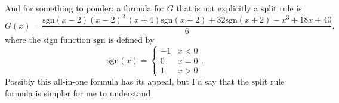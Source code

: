 \documentclass[12pt,fleqn,answers]{exam}
\newcommand{\signum}{\mathrm{sgn}}
\begin{document}
And for something to ponder: a formula for $G$ that is not 
explicitly a split rule is 
\begin{equation*}  
G(x) = \frac{\signum\left( x-2\right)  {{\left( x-2\right) }^{2}}\, \left( x+4\right)  \signum\left( x+2\right) +32 \signum\left( x+2\right) -{{x}^{3}}+18 x+40}{6},
\end{equation*}
where the sign function $\signum$ is defined by
\begin{equation*}
   \signum(x) = \begin{cases} -1 & x < 0 \\ 0 & x=0 \\ 1 & x>0 \end{cases}.
\end{equation*}
Possibly this all-in-one formula has its appeal, but I'd say that 
the split rule formula is simpler for me to understand.
\end{document}
